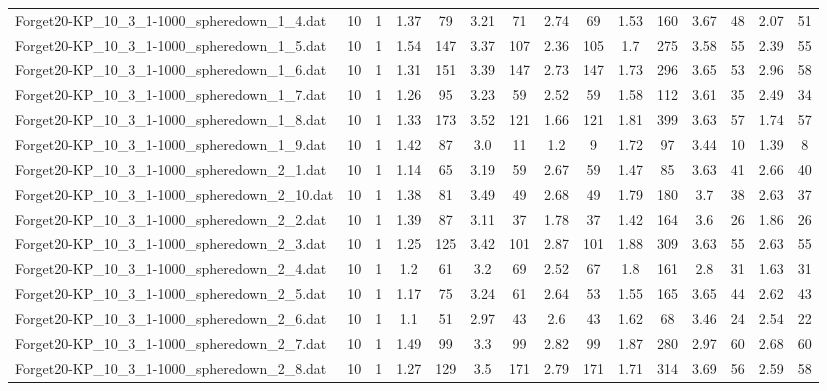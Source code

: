 \begin{table}[!ht]
{\begin{tabular}{lcccccccccccccc}
Forget20-KP\_10\_3\_1-1000\_spheredown\_1\_4.dat & 10 & 1 & 1.37 & 79 & 3.21 & 71 & 2.74 & 69 & 1.53 & 160 & 3.67 & 48 & 2.07 & 51 \\
Forget20-KP\_10\_3\_1-1000\_spheredown\_1\_5.dat & 10 & 1 & 1.54 & 147 & 3.37 & 107 & 2.36 & 105 & 1.7 & 275 & 3.58 & 55 & 2.39 & 55 \\
Forget20-KP\_10\_3\_1-1000\_spheredown\_1\_6.dat & 10 & 1 & 1.31 & 151 & 3.39 & 147 & 2.73 & 147 & 1.73 & 296 & 3.65 & 53 & 2.96 & 58 \\
Forget20-KP\_10\_3\_1-1000\_spheredown\_1\_7.dat & 10 & 1 & 1.26 & 95 & 3.23 & 59 & 2.52 & 59 & 1.58 & 112 & 3.61 & 35 & 2.49 & 34 \\
Forget20-KP\_10\_3\_1-1000\_spheredown\_1\_8.dat & 10 & 1 & 1.33 & 173 & 3.52 & 121 & 1.66 & 121 & 1.81 & 399 & 3.63 & 57 & 1.74 & 57 \\
Forget20-KP\_10\_3\_1-1000\_spheredown\_1\_9.dat & 10 & 1 & 1.42 & 87 & 3.0 & 11 & 1.2 & 9 & 1.72 & 97 & 3.44 & 10 & 1.39 & 8 \\
Forget20-KP\_10\_3\_1-1000\_spheredown\_2\_1.dat & 10 & 1 & 1.14 & 65 & 3.19 & 59 & 2.67 & 59 & 1.47 & 85 & 3.63 & 41 & 2.66 & 40 \\
Forget20-KP\_10\_3\_1-1000\_spheredown\_2\_10.dat & 10 & 1 & 1.38 & 81 & 3.49 & 49 & 2.68 & 49 & 1.79 & 180 & 3.7 & 38 & 2.63 & 37 \\
Forget20-KP\_10\_3\_1-1000\_spheredown\_2\_2.dat & 10 & 1 & 1.39 & 87 & 3.11 & 37 & 1.78 & 37 & 1.42 & 164 & 3.6 & 26 & 1.86 & 26 \\
Forget20-KP\_10\_3\_1-1000\_spheredown\_2\_3.dat & 10 & 1 & 1.25 & 125 & 3.42 & 101 & 2.87 & 101 & 1.88 & 309 & 3.63 & 55 & 2.63 & 55 \\
Forget20-KP\_10\_3\_1-1000\_spheredown\_2\_4.dat & 10 & 1 & 1.2 & 61 & 3.2 & 69 & 2.52 & 67 & 1.8 & 161 & 2.8 & 31 & 1.63 & 31 \\
Forget20-KP\_10\_3\_1-1000\_spheredown\_2\_5.dat & 10 & 1 & 1.17 & 75 & 3.24 & 61 & 2.64 & 53 & 1.55 & 165 & 3.65 & 44 & 2.62 & 43 \\
Forget20-KP\_10\_3\_1-1000\_spheredown\_2\_6.dat & 10 & 1 & 1.1 & 51 & 2.97 & 43 & 2.6 & 43 & 1.62 & 68 & 3.46 & 24 & 2.54 & 22 \\
Forget20-KP\_10\_3\_1-1000\_spheredown\_2\_7.dat & 10 & 1 & 1.49 & 99 & 3.3 & 99 & 2.82 & 99 & 1.87 & 280 & 2.97 & 60 & 2.68 & 60 \\
Forget20-KP\_10\_3\_1-1000\_spheredown\_2\_8.dat & 10 & 1 & 1.27 & 129 & 3.5 & 171 & 2.79 & 171 & 1.71 & 314 & 3.69 & 56 & 2.59 & 58 \\

\end{tabular}}
\end{table}
